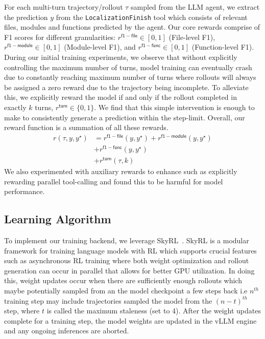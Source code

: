 
For each multi-turn trajectory/rollout $\tau$ sampled from the LLM agent, we extract the prediction $y$ from the \texttt{LocalizationFinish} tool which consists of relevant files, modules and functions predicted by the agent. Our core rewards comprise of F1 scores for different granularities: $r^{\mathsf{f1-file}} \in [0,1]$ (File-level F1), $r^{\mathsf{f1-module}} \in [0, 1]$ (Module-level F1), and $r^{\mathsf{f1-func}} \in [0, 1]$ (Function-level F1). During our initial training experiments, we observe that without explicitly controlling the maximum number of turns, model training can eventually crash due to constantly reaching maximum number of turns where rollouts will always be assigned a zero reward due to the trajectory being incomplete. To alleviate this, we explicitly reward the model if and only if the rollout completed in exactly $k$ turns, $r^{\mathsf{turn}} \in \{0,1\}$. We find that this simple intervention is enough to make \methodname to consistently generate a prediction within the step-limit. Overall, our reward function is a summation of all these rewards.
\begin{align}
    r(\tau, y, y^{\star}) &= r^{\mathsf{f1-file}}(y, y^{\star}) + r^{\mathsf{f1-module}}(y, y^{\star}) \nonumber \\ &+ r^{\mathsf{f1-func}}
    (y, y^{\star})
    \nonumber \\ &+ r^{\mathsf{turn}}(\tau, k)
\end{align}
We also experimented with auxiliary rewards to enhance \methodname such as explicitly rewarding parallel tool-calling and found this to be harmful for model performance.

\subsection{Learning Algorithm}\label{sec:train_algo}

To implement our training backend, we leverage SkyRL~\cite{griggs2025skrylv01}. SkyRL is a modular framework for training language models with RL which supports crucial features such as asynchronous RL training where both weight optimization and rollout generation can occur in parallel that allows for better GPU utilization. In doing this, weight updates occur when there are sufficiently enough rollouts which maybe potentially sampled from an the model checkpoint a few steps back i.e $n^{th}$ training step may include trajectories sampled the model from the $(n-t)^{th}$ step, where $t$ is called the maximum staleness (set to 4). After the weight updates complete for a training step, the model weights are updated in the vLLM engine and any ongoing inferences are aborted.

